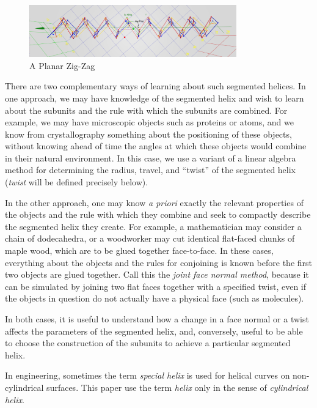 \documentclass{svproc}
\begin{document}
\begin{figure}
     \centering
     \includegraphics[width=0.80\textwidth]{figures/PlanarZigZag.png}
     \caption{A Planar Zig-Zag}
  \label{fig:planarzigzag}
\end{figure}

There are two complementary ways of learning about such segmented helices.
In one approach, we may have knowledge of the segmented helix and
wish to learn about the subunits and the rule with which the subunits are combined.
For example, we may have microscopic objects such as proteins
or atoms, and we know from crystallography something about the positioning of these objects, without
knowing ahead of time the angles at which these objects would combine in their natural environment.
In this case, we use a variant of a linear algebra method\cite{kahn1989defining}
for determining the radius, travel, and ``twist''
of the segmented helix ({\em twist} will be defined precisely below).

In the other approach, one may know {\it a priori} exactly the
relevant properties of the objects and the rule with which they combine
and seek to compactly describe the segmented helix they create.
For example, a mathematician may consider a chain of dodecahedra,
or a woodworker may cut identical flat-faced chunks of maple wood,
which are to be glued together face-to-face.
In these cases, everything about the objects and the rules for conjoining
is known before the first two objects are glued together.
Call this the {\em joint face normal method}, because
it can be simulated by joining two flat faces together with a specified twist,
even if the objects in question
do not actually have a physical face (such as molecules).

In both cases, it is useful to understand how a change in a face normal
or a twist affects the parameters
of the segmented helix,
and, conversely, useful to be able to choose the construction
of the subunits to achieve a particular segmented helix.

In engineering, sometimes the term {\em special helix}\cite{gu2012research}
is used for helical curves on non-cylindrical surfaces.
This paper use the term {\em helix} only in the
sense of {\em cylindrical helix}.
\end{document}
